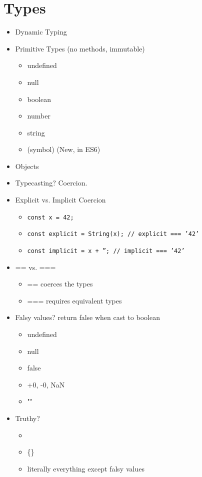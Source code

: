 \section{Types}
\begin{itemize}
	\item Dynamic Typing
	\item Primitive Types (no methods, immutable)
	      \begin{itemize}
		      \item undefined
		      \item null
		      \item boolean
		      \item number
		      \item string
		      \item (symbol) (New, in ES6)
	      \end{itemize}
	\item Objects
	\item Typecasting? Coercion.
	\item Explicit vs. Implicit Coercion
	      \begin{itemize}
		      \item \texttt{const x = 42;}
		      \item \texttt{const explicit = String(x); // explicit === '42'}
		      \item \texttt{const implicit = x + ''; // implicit === '42'}
	      \end{itemize}
	\item == vs. ===
	      \begin{itemize}
		      \item == coerces the types
		      \item === requires equivalent types
	      \end{itemize}
	\item Falsy values? return false when cast to boolean
	      \begin{itemize}
		      \item undefined
		      \item null
		      \item false
		      \item +0, -0, NaN
		      \item ""
	      \end{itemize}
	\item Truthy?
	      \begin{itemize}
		      \item \text{[]}
		      \item \{\}
		      \item literally everything except falsy values
	      \end{itemize}
\end{itemize}

